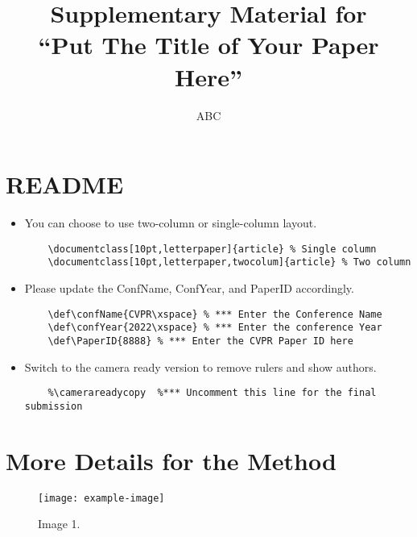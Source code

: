\documentclass[10pt,letterpaper]{article}
\def\confName{CVPR\xspace} %
\def\confYear{2022\xspace} %
\def\PaperID{8888} %
\begin{document}
\title{Supplementary Material for \\ ``Put The Title of Your Paper Here''}

\author{ABC}
\maketitle

{
    \hypersetup{linkcolor=black}
    \tableofcontents
}

\vspace{2cm}
\section{README}

\begin{itemize}
    \item You can choose to use two-column or single-column layout.
\begin{verbatim}
    \documentclass[10pt,letterpaper]{article} % Single column
    \documentclass[10pt,letterpaper,twocolum]{article} % Two column
\end{verbatim}

    \item Please update the ConfName, ConfYear, and PaperID accordingly.
\begin{verbatim}
    \def\confName{CVPR\xspace} % *** Enter the Conference Name
    \def\confYear{2022\xspace} % *** Enter the conference Year
    \def\PaperID{8888} % *** Enter the CVPR Paper ID here
\end{verbatim}
    
    \item Switch to the camera ready version to remove rulers and show authors.
\begin{verbatim}
    %\camerareadycopy  %*** Uncomment this line for the final submission
\end{verbatim}
\end{itemize}




\clearpage

\section{More Details for the Method}
\begin{figure}[h] \centering
    \texttt{[image: example-image]}
    \caption{Image 1.} \label{fig:}
\end{figure}
\end{document}
